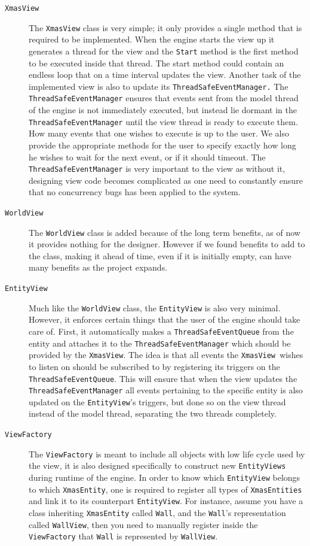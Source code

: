 \begin{description}
\item [{\texttt{XmasView}}] The \texttt{XmasView} class is very simple;
it only provides a single method that is required to be implemented.
When the engine starts the view up it generates a thread for the view
and the \texttt{Start} method is the first method to be executed inside
that thread. The start method could contain an endless loop that on
a time interval updates the view. Another task of the implemented
view is also to update its \texttt{ThreadSafeEventManager.} The \texttt{ThreadSafeEventManager}
ensures that events sent from the model thread of the engine is not
immediately executed, but instead lie dormant in the \texttt{ThreadSafeEventManager}
until the view thread is ready to execute them. How many events that
one wishes to execute is up to the user. We also provide the appropriate
methods for the user to specify exactly how long he wishes to wait
for the next event, or if it should timeout. The \texttt{ThreadSafeEventManager}
is very important to the view as without it, designing view code becomes
complicated as one need to constantly ensure that no concurrency bugs
has been applied to the system.
\item [{\texttt{WorldView}}] The \texttt{WorldView} class is added because
of the long term benefits, as of now it provides nothing for the designer.
However if we found benefits to add to the class, making it ahead
of time, even if it is initially empty, can have many benefits as
the project expands.
\item [{\texttt{EntityView}}] Much like the \texttt{WorldView} class, the
\texttt{EntityView} is also very minimal. However, it enforces certain
things that the user of the engine should take care of. First, it
automatically makes a \texttt{ThreadSafeEventQueue} from the entity
and attaches it to the \texttt{ThreadSafeEventManager} which should
be provided by the \texttt{XmasView}. The idea is that all events
the \texttt{XmasView }wishes to listen on should be subscribed to
by registering its triggers on the \texttt{ThreadSafeEventQueue}.
This will ensure that when the view updates the \texttt{ThreadSafeEventManager}
all events pertaining to the specific entity is also updated on the
\texttt{EntityView}\textquoteright{}s triggers, but done so on the
view thread instead of the model thread, separating the two threads
completely.
\item [{\texttt{ViewFactory}}] The \texttt{ViewFactory} is meant to include
all objects with low life cycle used by the view, it is also designed
specifically to construct new \texttt{EntityViews} during runtime
of the engine. In order to know which \texttt{EntityView} belongs
to which \texttt{XmasEntity}, one is required to register all types
of \texttt{XmasEntities} and link it to its counterpart \texttt{EntityView}.
For instance, assume you have a class inheriting \texttt{XmasEntity}
called \texttt{Wall}, and the \texttt{Wall}\textquoteright{}s representation
called \texttt{WallView}, then you need to manually register inside
the \texttt{ViewFactory} that \texttt{Wall} is represented by \texttt{WallView}. 
\end{description}

